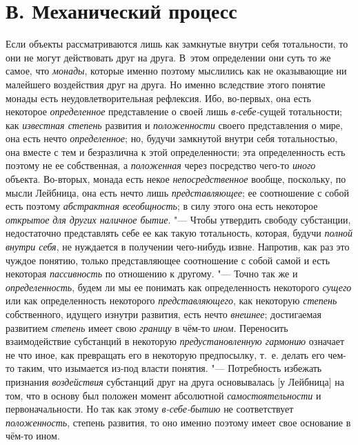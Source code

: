 {{\section[В. Механический процесс]{В. Механический процесс}
Если объекты рассматриваются лишь как замкнутые внутри себя
тотальности, то они не могут действовать друг на друга. В~этом определении
они суть то же самое, что {\em монады},
которые именно поэтому мыслились как не оказывающие ни
малейшего воздействия друг на друга. Но именно вследствие этого понятие
монады есть неудовлетворительная рефлексия. Ибо, во-первых, она есть
некоторое {\em определенное} представление о своей лишь {\em в-себе-}сущей
тотальности; как {\em известная степень} развития и {\em положенности} своего
представления о мире, она есть нечто {\em определенное}; но,
будучи замкнутой внутри себя тотальностью, она вместе с тем и безразлична к
этой определенности; эта определенность есть поэтому не ее собственная, а
{\em положенная} через посредство чего-то {\em иного}
объекта. Во-вторых, монада есть некое {\em непосредственное}
вообще, поскольку, по мысли Лейбница, она есть нечто лишь
{\em представляющее}; ее соотношение с собой есть поэтому
{\em абстрактная всеобщность}; в силу этого она есть некоторое
{\em открытое} {\em для других наличное бытие}. "---
Чтобы утвердить свободу субстанции, недостаточно представлять
себе ее как такую тотальность, которая, будучи {\em полной внутри себя},
не нуждается в получении чего-нибудь извне. Напротив, как раз
это чуждое понятию, только представляющее соотношение с собой самой и есть
некоторая {\em пассивность} по отношению к другому. "--- Точно так же и
{\em определенность}, будем ли мы ее понимать как определенность некоторого
{\em сущего} или как определенность некоторого {\em представляющего},
как некоторую {\em степень} собственного, идущего изнутри развития, есть нечто
{\em внешнее}; достигаемая развитием {\em степень} имеет свою
{\em границу} в чём-то {\em ином}. Переносить
взаимодействие субстанций в некоторую
{\em предустановленную гармонию}
означает не что иное, как превращать его в некоторую
предпосылку, т.~е. делать его чем-то таким, что изымается из-под власти
понятия. "--- Потребность избежать признания {\em воздействия}
субстанций друг на друга основывалась [у Лейбница] на том,
что в основу был положен момент абсолютной
{\em самостоятельности} и первоначальности. Но так как этому
{\em в-себе-бытию} не соответствует {\em положенность},
степень развития, то оно именно поэтому имеет свое основание в чём-то ином.

}}
